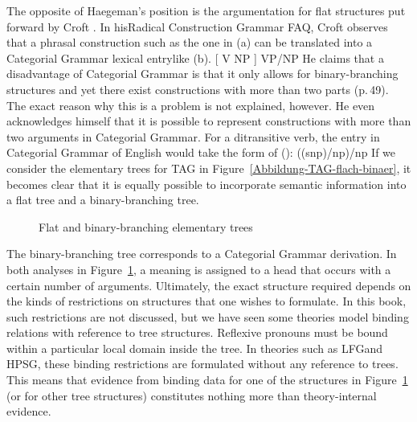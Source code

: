The opposite of Haegeman's position is the argumentation for flat structures put forward by Croft
\citeyearpar[Section~1.6.2]{Croft2001a}. In his\indexcxg Radical Construction Grammar FAQ, Croft observes that
a phrasal construction such as the one in (a) can be translated into a Categorial Grammar
lexical entry\indexcg like (b).
\eal
\ex {}[ V NP ]
\ex VP/NP
\zl
He claims that a disadvantage of Categorial Grammar is that it only allows for binary-branching structures and yet there exist constructions
with more than two parts (p.\,49). The exact reason why this is a problem is not explained, however. He even acknowledges himself that
it is possible to represent constructions with more than two arguments in Categorial Grammar. For a ditransitive verb, the entry in Categorial
Grammar of English would take the form of ():
\ea
((s\bs np)/np)/np
\z
If we consider the elementary trees for TAG in Figure~\vref{Abbildung-TAG-flach-binaer}, it becomes clear that it is equally possible
to incorporate semantic information into a flat tree and a binary-branching tree.
\begin{figure}
\hfill
{}
\hfill
{}
\hfill\mbox{}
\caption{\label{Abbildung-TAG-flach-binaer}Flat and binary-branching elementary trees}
\end{figure}%
The binary-branching tree corresponds to a Categorial Grammar derivation. In both analyses in 
Figure~\ref{Abbildung-TAG-flach-binaer}, a meaning is assigned to a head that occurs with a certain
number of arguments. Ultimately, the exact structure required depends on the kinds of restrictions on structures
that one wishes to formulate.
In this book, such restrictions are not discussed, but we have seen some theories model binding relations
with reference to tree structures. Reflexive pronouns must be bound within a particular local domain inside the
tree. In theories such as LFG\indexlfg and HPSG\indexhpsg, these binding restrictions are formulated
without any reference to trees.
This means that evidence from binding data for one of the structures in Figure~\ref{Abbildung-TAG-flach-binaer} (or for
other tree structures) constitutes nothing more than theory-internal evidence.

